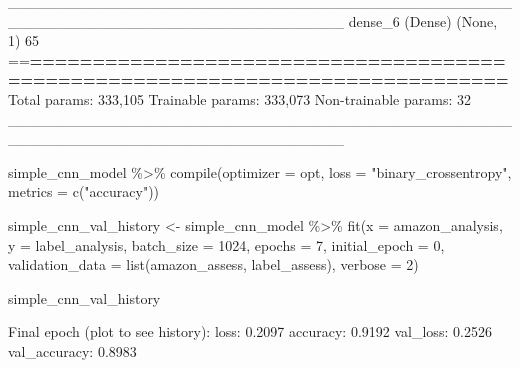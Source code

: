 \documentclass[
]{article}
\newenvironment{Shaded}{}{}
\newcommand{\AttributeTok}[1]{\textcolor[rgb]{0.49,0.56,0.16}{#1}}
\newcommand{\DecValTok}[1]{\textcolor[rgb]{0.25,0.63,0.44}{#1}}
\newcommand{\ErrorTok}[1]{\textcolor[rgb]{1.00,0.00,0.00}{\textbf{#1}}}
\newcommand{\FloatTok}[1]{\textcolor[rgb]{0.25,0.63,0.44}{#1}}
\newcommand{\FunctionTok}[1]{\textcolor[rgb]{0.02,0.16,0.49}{#1}}
\newcommand{\NormalTok}[1]{#1}
\newcommand{\OtherTok}[1]{\textcolor[rgb]{0.00,0.44,0.13}{#1}}
\newcommand{\SpecialCharTok}[1]{\textcolor[rgb]{0.25,0.44,0.63}{#1}}
\newcommand{\StringTok}[1]{\textcolor[rgb]{0.25,0.44,0.63}{#1}}
\begin{document}
\begin{Shaded}
\begin{Highlighting}[]
\NormalTok{\_\_\_\_\_\_\_\_\_\_\_\_\_\_\_\_\_\_\_\_\_\_\_\_\_\_\_\_\_\_\_\_\_\_\_\_\_\_\_\_\_\_\_\_\_\_\_\_\_\_\_\_\_\_\_\_\_\_\_\_\_\_\_\_\_\_\_\_\_\_\_\_\_\_\_\_\_\_\_\_}
\FunctionTok{dense\_6}\NormalTok{ (Dense)                     (None, }\DecValTok{1}\NormalTok{)                       }\DecValTok{65}          
\SpecialCharTok{==}\ErrorTok{==============================================================================}
\NormalTok{Total params}\SpecialCharTok{:} \DecValTok{333}\NormalTok{,}\DecValTok{105}
\NormalTok{Trainable params}\SpecialCharTok{:} \DecValTok{333}\NormalTok{,}\DecValTok{073}
\NormalTok{Non}\SpecialCharTok{{-}}\NormalTok{trainable params}\SpecialCharTok{:} \DecValTok{32}
\NormalTok{\_\_\_\_\_\_\_\_\_\_\_\_\_\_\_\_\_\_\_\_\_\_\_\_\_\_\_\_\_\_\_\_\_\_\_\_\_\_\_\_\_\_\_\_\_\_\_\_\_\_\_\_\_\_\_\_\_\_\_\_\_\_\_\_\_\_\_\_\_\_\_\_\_\_\_\_\_\_\_\_}
\end{Highlighting}
\end{Shaded}

\begin{Shaded}
\begin{Highlighting}[]
\NormalTok{simple\_cnn\_model }\SpecialCharTok{\%\textgreater{}\%}
    \FunctionTok{compile}\NormalTok{(}\AttributeTok{optimizer =}\NormalTok{ opt, }\AttributeTok{loss =} \StringTok{"binary\_crossentropy"}\NormalTok{, }\AttributeTok{metrics =} \FunctionTok{c}\NormalTok{(}\StringTok{"accuracy"}\NormalTok{))}
\end{Highlighting}
\end{Shaded}

\begin{Shaded}
\begin{Highlighting}[]
\NormalTok{simple\_cnn\_val\_history }\OtherTok{\textless{}{-}}\NormalTok{ simple\_cnn\_model }\SpecialCharTok{\%\textgreater{}\%}
    \FunctionTok{fit}\NormalTok{(}\AttributeTok{x =}\NormalTok{ amazon\_analysis, }\AttributeTok{y =}\NormalTok{ label\_analysis, }\AttributeTok{batch\_size =} \DecValTok{1024}\NormalTok{, }\AttributeTok{epochs =} \DecValTok{7}\NormalTok{, }\AttributeTok{initial\_epoch =} \DecValTok{0}\NormalTok{,}
        \AttributeTok{validation\_data =} \FunctionTok{list}\NormalTok{(amazon\_assess, label\_assess), }\AttributeTok{verbose =} \DecValTok{2}\NormalTok{)}

\NormalTok{simple\_cnn\_val\_history}

\NormalTok{Final }\FunctionTok{epoch}\NormalTok{ (plot to see history)}\SpecialCharTok{:}
\NormalTok{        loss}\SpecialCharTok{:} \FloatTok{0.2097}
\NormalTok{    accuracy}\SpecialCharTok{:} \FloatTok{0.9192}
\NormalTok{    val\_loss}\SpecialCharTok{:} \FloatTok{0.2526}
\NormalTok{val\_accuracy}\SpecialCharTok{:} \FloatTok{0.8983} 
\end{Highlighting}
\end{Shaded}
\end{document}
